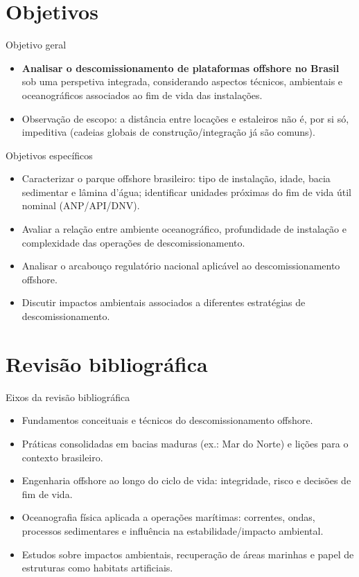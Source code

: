 \documentclass[aspectratio=169,11pt]{beamer}
\begin{document}
\section{Objetivos}

\begin{frame}{Objetivo geral}
\begin{itemize}
  \item \textbf{Analisar o descomissionamento de plataformas offshore no Brasil} sob uma perspetiva integrada, considerando aspectos técnicos, ambientais e oceanográficos associados ao fim de vida das instalações.
  \item Observação de escopo: a distância entre locações e estaleiros não é, por si só, impeditiva (cadeias globais de construção/integração já são comuns).
\end{itemize}
\end{frame}

\begin{frame}{Objetivos específicos}
\begin{itemize}
  \item Caracterizar o parque offshore brasileiro: tipo de instalação, idade, bacia sedimentar e lâmina d'água; identificar unidades próximas do fim de vida útil nominal (ANP/API/DNV).
  \item Avaliar a relação entre ambiente oceanográfico, profundidade de instalação e complexidade das operações de descomissionamento.
  \item Analisar o arcabouço regulatório nacional aplicável ao descomissionamento offshore.
  \item Discutir impactos ambientais associados a diferentes estratégias de descomissionamento.
\end{itemize}
\end{frame}

\section{Revisão bibliográfica}

\begin{frame}{Eixos da revisão bibliográfica}
\begin{itemize}
  \item Fundamentos conceituais e técnicos do descomissionamento offshore.
  \item Práticas consolidadas em bacias maduras (ex.: Mar do Norte) e lições para o contexto brasileiro.
  \item Engenharia offshore ao longo do ciclo de vida: integridade, risco e decisões de fim de vida.
  \item Oceanografia física aplicada a operações marítimas: correntes, ondas, processos sedimentares e influência na estabilidade/impacto ambiental.
  \item Estudos sobre impactos ambientais, recuperação de áreas marinhas e papel de estruturas como habitats artificiais.
\end{itemize}
\end{frame}
\end{document}
